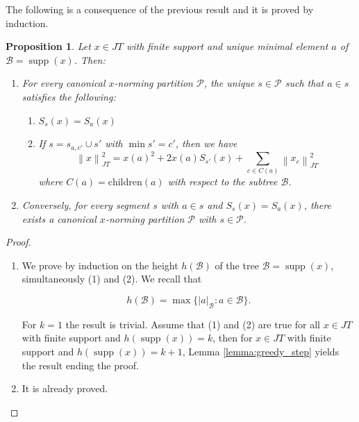 \documentclass[11pt,a4paper]{amsart}
\newtheorem{proposition}[theorem]{Proposition}
\newcommand{\JT}{JT}
\newcommand{\norm}[1]{\left\lVert#1\right\rVert}
\newcommand{\supp}{\operatorname{supp}}
\begin{document}
    The following is a consequence of the previous result and it is proved by induction.
    \begin{proposition}\label{P5.5} Let $x\in \JT$ with finite support and unique minimal element $a$ of $\mathcal{B}= \supp(x)$. Then:
    \begin{enumerate}
    \item For every canonical $x$-norming partition $\mathcal{P}$, the unique $s\in \mathcal{P}$ such that $a\in s$ satisfies the following:
    \begin{enumerate}
   \item $ S_s(x) = S_a(x)$ 
   \item If $s= s_{a, c'} \cup s'$  with $\min s' = c'$, then we have
        \begin{equation}
        \norm{x}_{\JT}^2 = x(a)^2 + 2x(a)S_{s'}(x) + \sum_{c \in C(a)} \norm{x_c}_{\JT}^2
    \end{equation}
    where $ C(a) = \text{children}(a)$ with respect to the subtree $\mathcal{B}$.
    \end{enumerate}
    
    \item Conversely, for every segment $s$ with $a\in s$ and $S_s(x) = S_a(x)$, there exists a canonical $x$-norming partition 
    $\mathcal{P}$ with $s\in \mathcal{P}$.
   
    \end{enumerate}
    \end{proposition}
    \begin{proof} 
    \begin{enumerate}
    \item We prove by induction on the height $h(\mathcal{B})$ of the tree $\mathcal{B} = \supp(x)$, simultaneously (1) and (2).  
    We recall that 
    
    \[ h(\mathcal{B})= \max\{|a|_\mathcal{B} : a\in \mathcal{B} \}. \]
    
    For $k=1$ the result is trivial. Assume that (1) and (2) are true for all $x\in \JT$ with finite support and $h(\supp(x)) = k$,
    then for $x\in \JT$ with finite support and $h(\supp(x)) = k+1$, Lemma \ref{lemma:greedy_step} yields the result ending the proof.
    
   
    \item It is already proved.
        
    \end{enumerate}
\end{proof}
\end{document}
